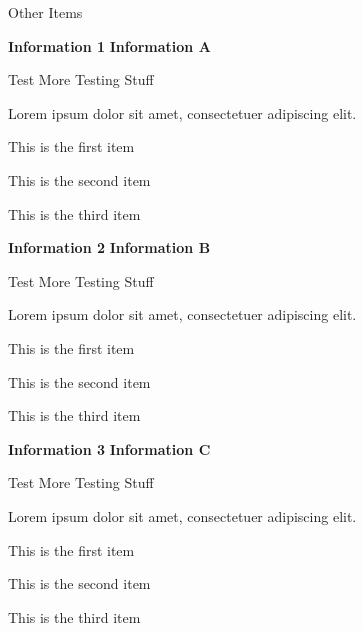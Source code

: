 \documentclass[11pt,letterpaper]{article}
\begin{document}
\textsf{\textcolor{customlightblue}{\Large{Other Items}}}  %

\smallskip


\large{\textbf{Information 1}} \hfill \large{\textbf{Information A}}

\normalsize{
    \textcolor{customgray}{Test}
    } \hfill
\normalsize{
    \textcolor{customgray}{More Testing Stuff}
    }

\normalsize{Lorem ipsum dolor sit amet, consectetuer adipiscing elit.}
\smallskip
\begin{itemize*}  %
    \item This is the first item
    \item This is the second item
    \item This is the third item
\end{itemize*}

\bigskip


\large{\textbf{Information 2}} \hfill \large{\textbf{Information B}}

\normalsize{
    \textcolor{customgray}{Test}
    } \hfill
\normalsize{
    \textcolor{customgray}{More Testing Stuff}
    }

\normalsize{Lorem ipsum dolor sit amet, consectetuer adipiscing elit.}
\smallskip
\begin{itemize*}  %
    \item This is the first item
    \item This is the second item
    \item This is the third item
\end{itemize*}

\bigskip


\large{\textbf{Information 3}} \hfill \large{\textbf{Information C}}

\normalsize{
    \textcolor{customgray}{Test}
    } \hfill
\normalsize{
    \textcolor{customgray}{More Testing Stuff}
    }

\normalsize{Lorem ipsum dolor sit amet, consectetuer adipiscing elit.}
\smallskip
\begin{itemize*}  %
    \item This is the first item
    \item This is the second item
    \item This is the third item
\end{itemize*}
\end{document}

